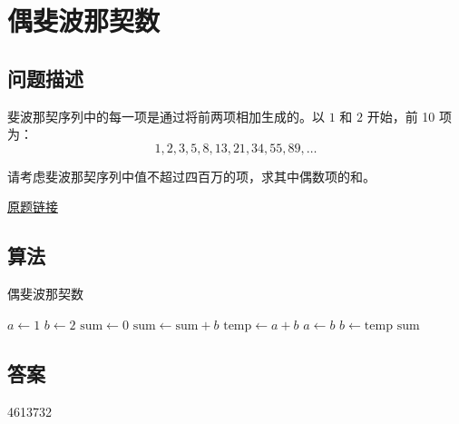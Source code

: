 \section{偶斐波那契数}\label{sec:problem02}
\subsection{问题描述}
\begin{tcolorbox}
	斐波那契序列中的每一项是通过将前两项相加生成的。以 $1$ 和 $2$ 开始，前 10 项为：
	$$1, 2, 3, 5, 8, 13, 21, 34, 55, 89, \dots$$

	请考虑斐波那契序列中值不超过四百万的项，求其中偶数项的和。

	\href{https://projecteuler.net/problem=2}{原题链接}
\end{tcolorbox}

\subsection{算法}
\begin{algorithm}
	\caption{偶斐波那契数}
	\begin{algorithmic}[1]
		\State \( a \gets 1 \)
		\State \(b \gets 2 \)
		\State \(\mathrm{sum} \gets 0 \)
		\State \( \mathrm{sum} \gets \mathrm{sum} + b \)
		\EndIf
		\State \( \mathrm{temp} \gets a + b \)
		\State \( a \gets b \)
		\State \( b \gets \mathrm{temp} \)
		\EndWhile
		\Return \( \mathrm{sum} \)
	\end{algorithmic}
\end{algorithm}

\subsection{答案}
4613732

